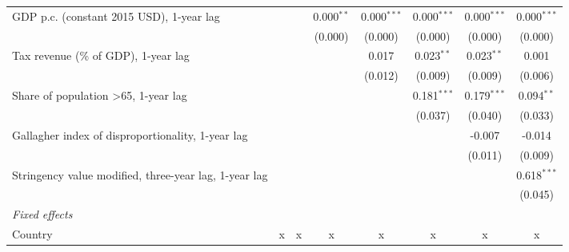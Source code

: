 \begin{table}[htbp]
\begin{tabular}{lccccccc}
      GDP p.c. (constant 2015 USD), 1-year lag                                &                &                & 0.000$^{**}$   & 0.000$^{***}$  & 0.000$^{***}$  & 0.000$^{***}$  & 0.000$^{***}$\\   
                                                                              &                &                & (0.000)        & (0.000)        & (0.000)        & (0.000)        & (0.000)\\   
      Tax revenue (\% of GDP), 1-year lag                                     &                &                &                & 0.017          & 0.023$^{**}$   & 0.023$^{**}$   & 0.001\\   
                                                                              &                &                &                & (0.012)        & (0.009)        & (0.009)        & (0.006)\\   
      Share of population >65, 1-year lag                                     &                &                &                &                & 0.181$^{***}$  & 0.179$^{***}$  & 0.094$^{**}$\\   
                                                                              &                &                &                &                & (0.037)        & (0.040)        & (0.033)\\   
      Gallagher index of disproportionality, 1-year lag                       &                &                &                &                &                & -0.007         & -0.014\\   
                                                                              &                &                &                &                &                & (0.011)        & (0.009)\\   
      Stringency value modified, three-year lag, 1-year lag                   &                &                &                &                &                &                & 0.618$^{***}$\\   
                                                                              &                &                &                &                &                &                & (0.045)\\   
      \emph{Fixed effects}\\
      Country                                                                 & x              & x              & x              & x              & x              & x              & x\\  

\end{tabular}
\end{table}
